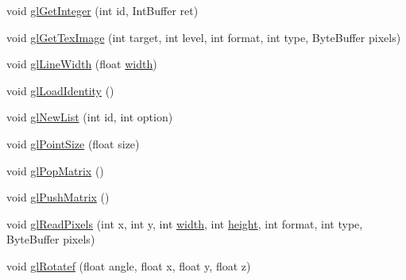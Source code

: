 \begin{DoxyCompactItemize}
\item 
void \mbox{\hyperlink{classorg_1_1newdawn_1_1slick_1_1opengl_1_1renderer_1_1_immediate_mode_o_g_l_renderer_a17ed77ba3c4fcd0246fad1357bae4f22}{gl\+Get\+Integer}} (int id, Int\+Buffer ret)
\item 
void \mbox{\hyperlink{classorg_1_1newdawn_1_1slick_1_1opengl_1_1renderer_1_1_immediate_mode_o_g_l_renderer_ab017144e4767647b0fe593feda2ba5cd}{gl\+Get\+Tex\+Image}} (int target, int level, int format, int type, Byte\+Buffer pixels)
\item 
void \mbox{\hyperlink{classorg_1_1newdawn_1_1slick_1_1opengl_1_1renderer_1_1_immediate_mode_o_g_l_renderer_a31bc611222a137427b8795f830af7eb7}{gl\+Line\+Width}} (float \mbox{\hyperlink{classorg_1_1newdawn_1_1slick_1_1opengl_1_1renderer_1_1_immediate_mode_o_g_l_renderer_a65d0a04d747368ea954f69074d9102d6}{width}})
\item 
void \mbox{\hyperlink{classorg_1_1newdawn_1_1slick_1_1opengl_1_1renderer_1_1_immediate_mode_o_g_l_renderer_a64a4b2b9f62fd02752de26da5e9b4b99}{gl\+Load\+Identity}} ()
\item 
void \mbox{\hyperlink{classorg_1_1newdawn_1_1slick_1_1opengl_1_1renderer_1_1_immediate_mode_o_g_l_renderer_a39396e48f77dfffca38c83a01cf865d9}{gl\+New\+List}} (int id, int option)
\item 
void \mbox{\hyperlink{classorg_1_1newdawn_1_1slick_1_1opengl_1_1renderer_1_1_immediate_mode_o_g_l_renderer_a94ff70b3e1685df7109524b1a6e10b9c}{gl\+Point\+Size}} (float size)
\item 
void \mbox{\hyperlink{classorg_1_1newdawn_1_1slick_1_1opengl_1_1renderer_1_1_immediate_mode_o_g_l_renderer_aa0deb1e58ef2250ce793cd6966bcdd70}{gl\+Pop\+Matrix}} ()
\item 
void \mbox{\hyperlink{classorg_1_1newdawn_1_1slick_1_1opengl_1_1renderer_1_1_immediate_mode_o_g_l_renderer_ab8bdefea69c51370d849bd1fe814cc9d}{gl\+Push\+Matrix}} ()
\item 
void \mbox{\hyperlink{classorg_1_1newdawn_1_1slick_1_1opengl_1_1renderer_1_1_immediate_mode_o_g_l_renderer_a7326fdbf7c8cbb6b63fb61f9b5693087}{gl\+Read\+Pixels}} (int x, int y, int \mbox{\hyperlink{classorg_1_1newdawn_1_1slick_1_1opengl_1_1renderer_1_1_immediate_mode_o_g_l_renderer_a65d0a04d747368ea954f69074d9102d6}{width}}, int \mbox{\hyperlink{classorg_1_1newdawn_1_1slick_1_1opengl_1_1renderer_1_1_immediate_mode_o_g_l_renderer_aec68994a0ee3b7b478122af823c8a8d7}{height}}, int format, int type, Byte\+Buffer pixels)
\item 
void \mbox{\hyperlink{classorg_1_1newdawn_1_1slick_1_1opengl_1_1renderer_1_1_immediate_mode_o_g_l_renderer_a998aac166770b6e32bdd4ded87629701}{gl\+Rotatef}} (float angle, float x, float y, float z)

\end{DoxyCompactItemize}

